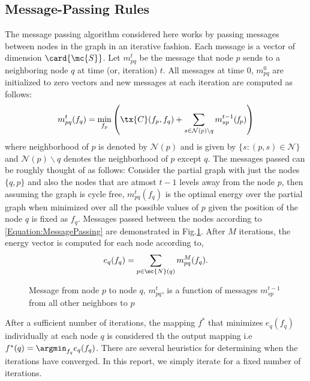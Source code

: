\documentclass[journal, onecolumn]{IEEEtran}
\begin{document}
\subsection{Message-Passing Rules}
The message passing algorithm considered here works by passing messages between nodes in the graph in an iterative fashion. Each message is a vector of dimension $\card{\mc{S}}$. Let $m_{pq}^{t}$ be the message that node $p$ sends to a neighboring node $q$ at time (or, iteration) $t$. All messages at time $0$, $m_{pq}^{0}$ are initialized to zero vectors and new  messages at each iteration are computed as follows:
\begin{equation}
 m_{pq}^{t}(f_{q})=\min_{f_{p}} \left( \tx{C}(f_{p},f_{q})+ \sum_{s\in \mathcal{N}(p)\backslash q}m_{sp}^{t-1}(\mathit{f}_{p})  \right)
\label{Equation:MessagePassing}
\end{equation}
where neighborhood of $p$ is denoted by $\mathcal{N}(p)$ and is given by $\{s:(p,s)\in \mathcal{N} \}$ and $\mathcal{N}(p)\backslash q$ denotes the neighborhood of $p$ except $q$. The messages passed can be roughly thought of as follows: Consider the partial graph with just the nodes $\{q,p\}$ and also the nodes that are atmost $t-1$ levels away from the node $p$, then assuming the graph is cycle free, $ m_{pq}^{t}(f_{q})$ is the optimal energy over the partial graph when minimized over all the possible values of $p$ given the position of the node $q$ is fixed as $f_{q}$. Messages passed between the nodes according to \eqref{Equation:MessagePassing} are demonstrated in Fig.\ref{Fig:GenericMessagePassing}. After $M$ iterations, the energy vector is computed for each node according to,
\begin{equation}
e_{q}(f_{q})=\sum_{p\in \mc{N}(q)}m_{pq}^{M}(f_{q}).
\end{equation}

\begin{figure}[h!]
\centering

\caption{Message from node $p$ to node $q$, $m_{pq}^{t}$, is a function of messages {$m_{sp}^{t-1}$} from all other neighbors to $p$}
\label{Fig:GenericMessagePassing}
\end{figure}


After a sufficient number of iterations, the mapping $f^{*}$ that minimizes $e_{q}(f_{q})$ individually at each node $q$ is considered th the output mapping i.e $f^{*}(q)=\argmin_{f_{q}}e_{q}(f_{q})$. There are several heuristics for determining when the iterations have converged. In this report, we simply iterate for a fixed number of iterations.
\end{document}
